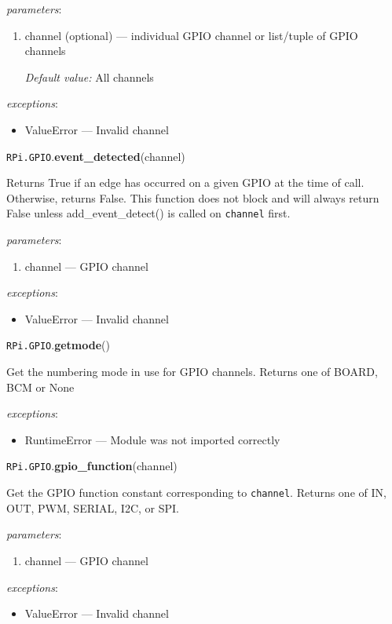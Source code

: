 \documentclass[12pt]{article}
\begin{document}
\textit{parameters}:
\begin{enumerate}      
        \item channel (optional) --- individual GPIO channel or list/tuple of GPIO channels
        
        \textit{Default value:} All channels
\end{enumerate}
 
\textit{exceptions}:
\begin{itemize}
    \item ValueError --- Invalid channel
\end{itemize}

\noindent \texttt{RPi.GPIO}.\textbf{event\_detected}(channel)

Returns True if an edge has occurred on a given GPIO at the time of call. Otherwise, returns False. This function does not block and will always return False unless add\_event\_detect() is called on \texttt{channel} first.


\textit{parameters}:
\begin{enumerate}      
        \item channel --- GPIO channel
\end{enumerate}
 
 
\textit{exceptions}:
\begin{itemize}
    \item ValueError --- Invalid channel
\end{itemize}

\noindent \texttt{RPi.GPIO}.\textbf{getmode}()
    
Get the numbering mode in use for GPIO channels. Returns one of BOARD, BCM or None

\textit{exceptions}:
\begin{itemize}
    \item RuntimeError --- Module was not imported correctly
\end{itemize}


\noindent \texttt{RPi.GPIO}.\textbf{gpio\_function}(channel)
        
Get the GPIO function constant corresponding to \texttt{channel}. Returns one of IN, OUT, PWM, SERIAL, I2C, or SPI.
        
\textit{parameters}:
\begin{enumerate}      
        \item channel --- GPIO channel
\end{enumerate}
 
 
\textit{exceptions}:
\begin{itemize}
    \item ValueError --- Invalid channel
\end{itemize}
\end{document}
